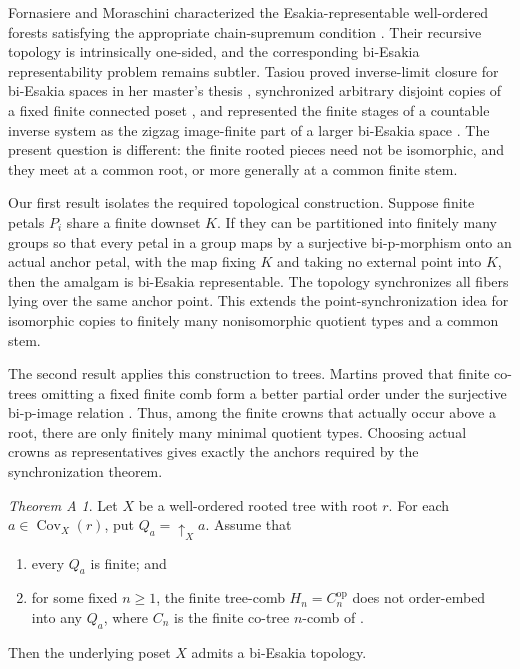 \documentclass[11pt]{article}
\theoremstyle{remark}
\newtheorem*{maintheorem}{Theorem A}
\numberwithin{equation}{section}
\begin{document}
Fornasiere and Moraschini characterized the Esakia-representable well-ordered
forests satisfying the appropriate chain-supremum condition \cite{ref4}. Their
recursive topology is intrinsically one-sided, and the corresponding bi-Esakia
representability problem remains subtler. Tasiou proved inverse-limit closure
for bi-Esakia spaces in her master's thesis \cite[Theorem 4.2.6]{ref1},
synchronized arbitrary disjoint copies of a fixed finite connected poset
\cite[Theorem 4.3.4]{ref1}\cite[Theorem 4.6]{ref2}, and represented the finite
stages of a countable inverse system as the zigzag image-finite part of a
larger bi-Esakia space
\cite[Theorem 4.3.8]{ref1}\cite[Theorem 4.3]{ref2}. The present question is
different: the finite rooted pieces need not be isomorphic, and they meet at a
common root, or more generally at a common finite stem.

Our first result isolates the required topological construction. Suppose finite
petals $P_i$ share a finite downset $K$. If they can be partitioned into
finitely many groups so that every petal in a group maps by a surjective
bi-p-morphism onto an actual anchor petal, with the map fixing $K$ and taking no
external point into $K$, then the amalgam is bi-Esakia representable. The
topology synchronizes all fibers lying over the same anchor point. This extends
the point-synchronization idea for isomorphic copies to finitely many
nonisomorphic quotient types and a common stem.

The second result applies this construction to trees. Martins proved that
finite co-trees omitting a fixed finite comb form a better partial order under
the surjective bi-p-image relation \cite[Proposition 4.10]{ref5}. Thus, among
the finite crowns that actually occur above a root, there are only finitely many
minimal quotient types. Choosing actual crowns as representatives gives
exactly the anchors required by the synchronization theorem.

\begin{maintheorem}
Let $X$ be a well-ordered rooted tree with root $r$. For each
$a\in\operatorname{Cov}_X(r)$, put $Q_a=\uparrow_Xa$. Assume that
\begin{enumerate}
\item every $Q_a$ is finite; and
\item for some fixed $n\geq1$, the finite tree-comb
  $H_n=C_n^{\mathrm{op}}$ does not order-embed into any $Q_a$, where $C_n$ is
  the finite co-tree $n$-comb of \cite{ref5}.
\end{enumerate}
Then the underlying poset $X$ admits a bi-Esakia topology.
\end{maintheorem}
\end{document}
